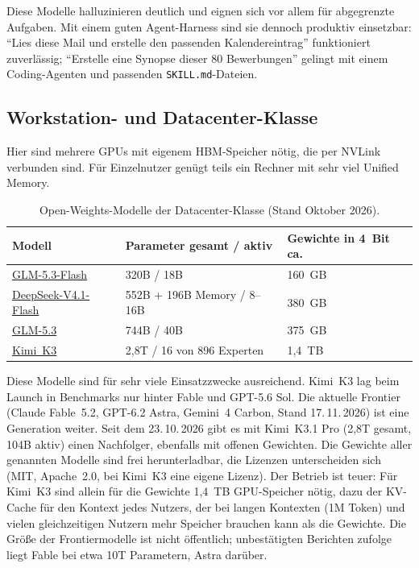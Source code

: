 \documentclass[a4paper,11pt]{article}
\begin{document}
Diese Modelle halluzinieren deutlich und eignen sich vor allem für
abgegrenzte Aufgaben. Mit einem guten Agent-Harness sind sie dennoch
produktiv einsetzbar: \enquote{Lies diese Mail und erstelle den
passenden Kalendereintrag} funktioniert zuverlässig; \enquote{Erstelle
eine Synopse dieser 80 Bewerbungen} gelingt mit einem Coding-Agenten
und passenden \texttt{SKILL.md}-Dateien.

\subsection{Workstation- und Datacenter-Klasse}

Hier sind mehrere GPUs mit eigenem HBM-Speicher nötig, die per NVLink
verbunden sind. Für Einzelnutzer genügt teils ein Rechner mit sehr viel
Unified Memory.

\begin{table}[htbp]
  \centering
  \begin{tabular}{lll}
    \toprule
    Modell & Parameter gesamt / aktiv & Gewichte in 4~Bit ca. \\
    \midrule
    \href{https://huggingface.co/zai-org/GLM-5.3-Flash}{GLM-5.3-Flash} & 320B / 18B & 160~GB \\
    \href{https://huggingface.co/deepseek-ai/DeepSeek-V4.1-Flash}{DeepSeek-V4.1-Flash} & 552B + 196B Memory / 8--16B & 380~GB \\
    \href{https://huggingface.co/zai-org/GLM-5.3}{GLM-5.3} & 744B / 40B & 375~GB \\
    \href{https://huggingface.co/moonshotai/Kimi-K3}{Kimi~K3} & 2,8T / 16 von 896 Experten & 1,4~TB \\
    \bottomrule
  \end{tabular}
  \caption{Open-Weights-Modelle der Datacenter-Klasse (Stand Oktober 2026).}
  \label{tab:modelle}
\end{table}

Diese Modelle sind für sehr viele Einsatzzwecke ausreichend. Kimi~K3
lag beim Launch in Benchmarks nur hinter Fable und GPT-5.6 Sol.  Die
aktuelle Frontier (Claude Fable~5.2, GPT-6.2 Astra, Gemini~4 Carbon,
Stand 17.\,11.\,2026) ist eine Generation weiter.  Seit dem
23.\,10.\,2026 gibt es mit Kimi~K3.1 Pro (2,8T gesamt, 104B aktiv)
einen Nachfolger, ebenfalls mit offenen Gewichten.
Die Gewichte aller genannten Modelle sind frei herunterladbar, die
Lizenzen unterscheiden sich (MIT, Apache~2.0, bei Kimi~K3 eine eigene
Lizenz). Der Betrieb ist teuer: Für Kimi~K3 sind allein für die
Gewichte 1,4~TB GPU-Speicher nötig, dazu der KV-Cache für den Kontext
jedes Nutzers, der bei langen Kontexten (1M Token) und vielen
gleichzeitigen Nutzern mehr Speicher brauchen kann als die Gewichte.
Die Größe der Frontiermodelle ist nicht öffentlich;
unbestätigten Berichten zufolge liegt Fable bei etwa 10T Parametern,
Astra darüber.
\end{document}
